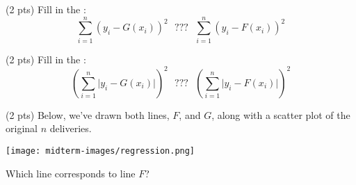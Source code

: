 \documentclass[twoside,12pt]{article}
\begin{document}
\begin{probset}
\begin{prob}[(6 pts)]
\begin{subprobset}

\begin{subprob}(2 pts) Fill in the : $$\displaystyle \sum_{i = 1}^n (y_i - G(x_i))^2 \:\:\: \boxed{???} \:\:\: \sum_{i = 1}^n (y_i - F(x_i))^2$$
\bubble{$\geq$} 
\bubble{$>$} 
\bubble{$=$} 
\bubble{$<$} 
\bubble{$\leq$} 
\end{subprob}

\begin{subprob}(2 pts) Fill in the : $$\displaystyle \left( \sum_{i = 1}^n \big| y_i - G(x_i) \big| \right)^2 \:\:\: \boxed{???} \:\:\: \left( \sum_{i = 1}^n \big| y_i - F(x_i) \big| \right)^2$$
\bubble{$\geq$} 
\bubble{$>$} 
\bubble{$=$} 
\bubble{$<$} 
\bubble{$\leq$} 
\end{subprob}

\begin{subprob}(2 pts) Below, we've drawn both lines, $F$, and $G$, along with a scatter plot of the original $n$ deliveries.

\begin{center}
\texttt{[image: midterm-images/regression.png]}
\end{center}

Which line corresponds to line \textbf{$F$}?
\end{subprob}












\end{subprobset}
\end{prob}
\end{probset}
\end{document}
